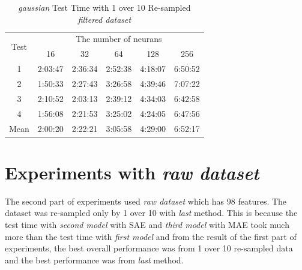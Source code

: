 \documentclass[draft,dvipsnames]{drexel-thesis}
\begin{document}
\begin{thesis}
\begin{table}[!t]
\centering
\caption{{\em gaussian} Test Time with 1 over 10 Re-sampled {\em filtered dataset}}
\label{tbl:gaussian_1_10_time}
\begin{tabular}{|c|c|c|c|c|c|}
\hline
\multirow{2}{*}{Test}      & \multicolumn{5}{c|}{The number of neurans}                                                                                                               \\ \cline{2-6}
                           & 16                           & 32                           & 64                           & 128                          & 256                          \\ \hline
1                          & 2:03:47                      & 2:36:34                      & 2:52:38                      & 4:18:07                      & 6:50:52                      \\ \hline
2                          & 1:50:33                      & 2:27:43                      & 3:26:58                      & 4:39:46                      & 7:07:22                      \\ \hline
3                          & 2:10:52                      & 2:03:13                      & 2:39:12                      & 4:34:03                      & 6:42:58                      \\ \hline
4                          & 1:56:08                      & 2:21:53                      & 3:25:02                      & 4:24:05                      & 6:47:56                      \\ \hline
\multicolumn{1}{|l|}{Mean} & \multicolumn{1}{l|}{2:00:20} & \multicolumn{1}{l|}{2:22:21} & \multicolumn{1}{l|}{3:05:58} & \multicolumn{1}{l|}{4:29:00} & \multicolumn{1}{l|}{6:52:17} \\ \hline
\end{tabular}
\end{table}


\section{Experiments with {\em raw dataset}}
The second part of experiments used {\em raw dataset} which has 98 features. The dataset was re-sampled only by 1 over 10 with {\em last} method. This is because the test time with {\em second model} with SAE and {\em third model} with MAE took much more than the test time with {\em first model} and from the result of the first part of experiments, the best overall performance was from 1 over 10 re-sampled data and the best performance was from {\em last} method.


\end{thesis}
\end{document}
